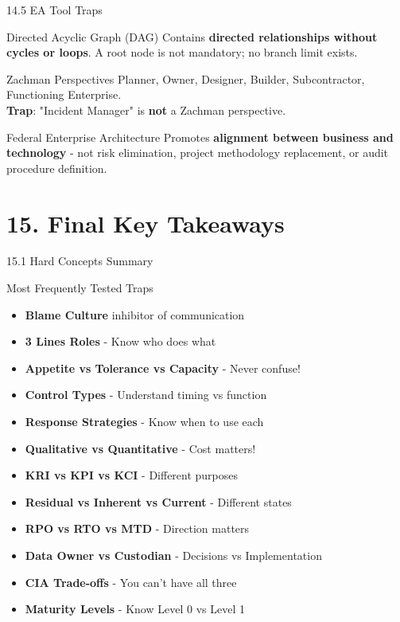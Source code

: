 \documentclass{beamer}
\begin{document}
	\begin{frame}{14.5 EA Tool Traps}
		\begin{block}{Directed Acyclic Graph (DAG)}
			Contains \textbf{directed relationships without cycles or loops}. A root node is not mandatory; no branch limit exists.
		\end{block}
		
		\begin{block}{Zachman Perspectives}
			Planner, Owner, Designer, Builder, Subcontractor, Functioning Enterprise. \\
			\textbf{Trap}: "Incident Manager" is \textbf{not} a Zachman perspective.
		\end{block}
		
		\begin{block}{Federal Enterprise Architecture}
			Promotes \textbf{alignment between business and technology} - not risk elimination, project methodology replacement, or audit procedure definition.
		\end{block}
	\end{frame}
	
	\section{15. Final Key Takeaways}
	
	\begin{frame}{15.1 Hard Concepts Summary}
		\begin{block}{Most Frequently Tested Traps}
			\begin{itemize}
				\item \textbf{Blame Culture} inhibitor of communication
				\item \textbf{3 Lines Roles} - Know who does what
				\item \textbf{Appetite vs Tolerance vs Capacity} - Never confuse!
				\item \textbf{Control Types} - Understand timing vs function
				\item \textbf{Response Strategies} - Know when to use each
				\item \textbf{Qualitative vs Quantitative} - Cost matters!
				\item \textbf{KRI vs KPI vs KCI} - Different purposes
				\item \textbf{Residual vs Inherent vs Current} - Different states
				\item \textbf{RPO vs RTO vs MTD} - Direction matters
				\item \textbf{Data Owner vs Custodian} - Decisions vs Implementation
				\item \textbf{CIA Trade-offs} - You can't have all three
				\item \textbf{Maturity Levels} - Know Level 0 vs Level 1
			\end{itemize}
		\end{block}
	\end{frame}
	
\end{document}
